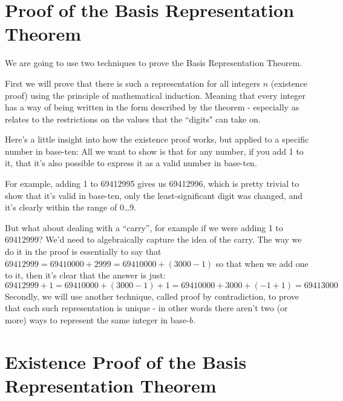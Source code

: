 \documentclass{article}
\begin{document}
\section*{Proof of the  Basis Representation Theorem}
We are going to use two techniques to prove the Basis Representation Theorem.

First we will prove that there is such a representation for all
integers $n$ (existence proof) using the principle of mathematical induction.
Meaning that every integer has a way of being written
in the form described by the theorem - especially as
relates to the restrictions on the values that the ``digits" can take on.

Here's a little insight into how the existence proof works, but applied to a specific number in base-ten:
All we want to show is that for any number, if you add 1 to it, that it's also possible to express it as a valid number in base-ten.

For example, adding 1 to 69412995 gives us 69412996, which is pretty trivial to show that it's valid in base-ten, only the least-significant digit was
changed, and it's clearly within the range of 0\dots{}9.

But what about dealing with a ``carry'', for example 
if we were adding 1 to 69412999? We'd need to algebraically capture the idea of the carry.  The way
we do it in the proof is essentially to say that $69412999 = 69410000 + 2999 = 69410000 + (3000-1)$ so that when we add one to it, then
it's clear that the answer is just:
\[69412999 + 1 = 69410000 + (3000-1) + 1 = 69410000 + 3000 + (-1 + 1) = 69413000\]
Secondly, we will use another technique, called proof by contradiction,
to prove that each such representation is unique - in other
words there aren't two (or more) ways to represent the same integer in base-$b$.

\section*{Existence Proof of the Basis Representation Theorem}
\end{document}
